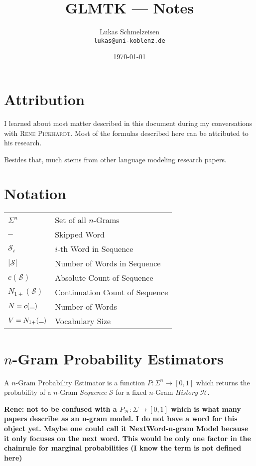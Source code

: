 \documentclass[11pt,a4paper]{article}
\title{GLMTK --- Notes}
\author{Lukas Schmelzeisen \\ \texttt{lukas@uni-koblenz.de}}
\date{\today}
\newcommand{\Seq}{\mathcal{S}}
\newcommand{\Hist}{\mathcal{H}}
\newcommand{\Skp}{\rule{7pt}{.5pt}}
\newcommand{\rp}[1]{\textbf{Rene: #1}}
\begin{document}
  \maketitle
  \tableofcontents
  \clearpage

  \section{Attribution}

  I learned about most matter described in this document during my
  conversations with \textsc{Rene Pickhardt}. Most of the formulas described
  here can be attributed to his research.

  Besides that, much stems from other language modeling research papers.

  \section{Notation}

  \begin{tabular}{ l l }
    $\Sigma^n$  & Set of all $n$-Grams \\
    $\Skp$ & Skipped Word \\
    $\Seq_i$ & $i$-th Word in Sequence \\
    $|\Seq|$ & Number of Words in Sequence \\
    $c(\Seq)$ & Absolute Count of Sequence \\
    $N_{1+}(\Seq)$ & Continuation Count of Sequence \\
    $N = c(\Skp)$ & Number of Words \\
    $V = N_{1+}(\Skp)$ & Vocabulary Size \\
  \end{tabular}

  \section{$n$-Gram Probability Estimators}

  A $n$-Gram Probability Estimator is a function $P :\Sigma^n \to [0,1]$ which
  returns the probability of a $n$-Gram \emph{Sequence} $\Seq$ for a fixed
  $n$-Gram \emph{History} $\Hist$.

  \rp{not to be confused with a $P_\Hist:\Sigma \to [0,1]$ which is what many
  papers describe as an n-gram model. I do not have a word for this object yet.
  Maybe one could call it NextWord-n-gram Model because it only focuses on the
  next word. This would be only one factor in the chainrule for marginal
  probabilities (I know the term is not defined here)}
\end{document}
